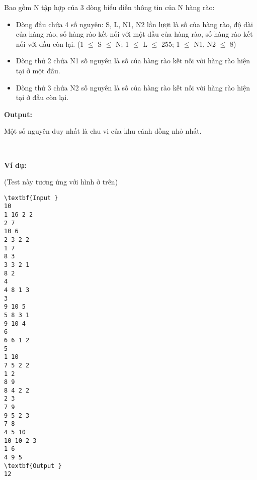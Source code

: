 Bao gồm N tập hợp của 3 dòng biểu diễn thông tin của N hàng rào:
\begin{itemize}
	\item Dòng đầu chứa 4 số nguyên: S, L, N1, N2 lần lượt là số của hàng rào, độ dài của hàng rào, số hàng rào kết nối với một đầu của hàng rào, số hàng rào kết nối với đầu còn lại. (1 $\le$ S $\le$ N; 1 $\le$ L $\le$ 255; 1 $\le$ N1, N2 $\le$ 8)
\end{itemize}
\begin{itemize}
	\item Dòng thứ 2 chứa N1 số nguyên là số của hàng rào kết nối với hàng rào hiện tại ở một đầu.
\end{itemize}
\begin{itemize}
	\item Dòng thứ 3 chứa N2 số nguyên là số của hàng rào kết nối với hàng rào hiện tại ở đầu còn lại.
\end{itemize}

\textbf{Output: }\textbf{}

Một số nguyên duy nhất là chu vi của khu cánh đồng nhỏ nhất.

 

\textbf{Ví dụ: }

(Test này tương ứng với hình ở trên) \textbf{}
\begin{verbatim}
\textbf{Input }
10
1 16 2 2
2 7
10 6
2 3 2 2
1 7
8 3
3 3 2 1
8 2
4
4 8 1 3
3
9 10 5
5 8 3 1
9 10 4
6
6 6 1 2
5
1 10
7 5 2 2
1 2
8 9
8 4 2 2
2 3
7 9
9 5 2 3
7 8
4 5 10
10 10 2 3
1 6
4 9 5
\textbf{Output }
12\end{verbatim}
